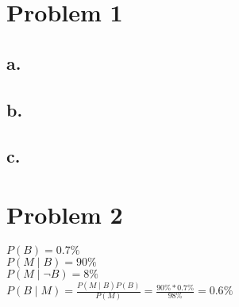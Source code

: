 \documentclass{article}
\begin{document}
\section{Problem 1}
	\subsection{a.}
	\subsection{b.}
	\subsection{c.}

\section {Problem 2}
	$P(B) = 0.7\%$\\
	$P(M \mid B) = 90\%$\\
	$P(M \mid \neg B) = 8\%$\\
	$P(B \mid M)  = \frac{P(M \mid B) P(B)}{P(M)} = \frac{90\% * 0.7\%}{98\%} = \mathbf{0.6\%}$
\end{document}
